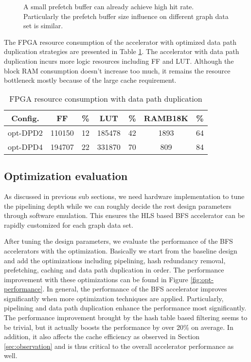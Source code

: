 \begin{figure}
    \caption{A small prefetch buffer can already achieve high hit rate.
    Particularly the prefetch buffer size influence on different graph 
    data set is similar.}
\label{fig:prefetch-hit}
\end{figure}

The FPGA resource consumption of the accelerator with optimized data path duplication 
strategies are presented in Table \ref{tab:duplicate-resource}. The accelerator 
with data path duplication incurs more logic resources including FF and LUT. 
Although the block RAM consumption doesn't increase too much, it remains the 
resource bottleneck mostly because of the large cache requirement.

\begin{table}
  \caption{FPGA resource consumption with data path duplication}
  \label{tab:duplicate-resource}
    \centering
  \begin{tabular}{ccccccc}
    \toprule
      Config. & FF & \% & LUT & \% & RAMB18K & \% \\
    \midrule
      opt-DPD2  & 110150 & 12 & 185478 & 42 & 1893  & 64 \\
      opt-DPD4  & 194707 & 22 & 331870 & 70 & 809  & 84 \\
  \bottomrule
\end{tabular}
\end{table}

\subsection{Optimization evaluation}
As discussed in previous sub sections, we need hardware implementation 
to tune the pipelining depth while we can roughly decide the rest 
design parameters through software emulation. This ensures the HLS based 
BFS accelerator can be rapidly customized for each graph data set.

After tuning the design parameters, we evaluate the 
performance of the BFS accelerators with the optimization. 
Basically we start from the baseline design and 
add the optimizations including pipelining, hash redundancy removal, 
prefetching, caching and data path duplication in order. The performance improvement 
with these optimizations can be found in Figure \ref{fig:opt-performance}. 
In general, the performance of the BFS accelerator improves 
significantly when more optimization techniques are applied. Particularly,
pipelining and data path duplication enhance the performance most 
significantly. The performance improvement brought by the hash table based filtering 
seems to be trivial, but it actually boosts the performance by over 20\% on average. 
In addition, it also affects the cache efficiency as observed in Section \ref{sec:observation}
and is thus critical to the overall accelerator performance as well.

